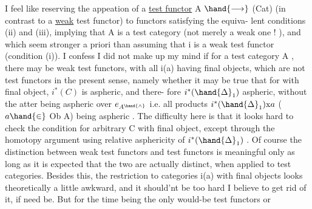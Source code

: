 I feel like reserving the appeation of a \uline{test functor}  A $\hand{\longrightarrow}$ (Cat)
(in contrast to a \uline{weak} test functor)  to functors satisfying the equiva-%
lent conditions (ii) and (iii),  implying that A is a test category (not
merely a weak one ! ),  and which seem stronger a priori than assuming
  that i is a weak test functor  (condition (i)).  I confess I did
not make up my mind if  for a test category A , there may be weak
test functors,  with all i(a) having final objects,  which are not test
functors in the present sense,  namely whether it may be true that  for
   with final object,  $i^*(C)$ is aspheric,  and  there-%
fore $i^*(\hand{\Delta}_1)$ aspheric,  without the atter being aspheric over $e_{A^{\hand{\wedge}}}$ i.e.
all products $i^*(\hand{\Delta}_1) \mathrm{x} a$  ($a \hand{\in}$ Ob A) being aspheric .  The difficulty here
is that it looks hard to check the condition for arbitrary C with final
object,  except through the homotopy argument using relative asphericity
of $i^*(\hand{\Delta}_1)$ .  Of course the distinction between weak test functors and test
functors is meaningful only as long as it is expected that the two are
actually distinct,  when applied to test categories.  Besides this,  the
restriction to categories i(a) with final objects looks theoretically a
little awkward,  and it should'nt be too hard I believe to get rid of it,
if need be.  But for the time being the only would-be test functors or
